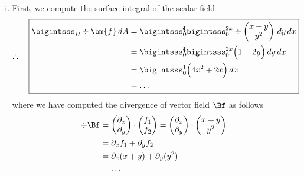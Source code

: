 \documentclass[12pt]{article}
\begin{document}
\begin{enumerate}[(i)]
	\item First, we compute the surface integral of the scalar field
	      \begin{align}
		      \therefore\quad
		      \boxed{
			      \begin{aligned}
				      \bigintsss_B \div \bm{f} \, dA
				       & =\bigintsss_0^1 \!\!\! \bigintsss_0^{2x}
				      \div
				      \begin{pmatrix} x+y\\y^2 \end{pmatrix} \, dy \, dx                     \\
				       & =\bigintsss_0^1 \!\!\! \bigintsss_0^{2x} \Big(1+2y\Big) \, dy \, dx \\
				       & =\bigintsss_0^1 \Big( 4x^2 + 2x \Big) \, dx                         \\
				       & = \dots
			      \end{aligned}
		      }
	      \end{align}
	      where we have computed the divergence of vector field $\Bf$ as follows
	      \begin{align}
		      \div \Bf 
		       & = 	
		      \begin{pmatrix} \partial_x \\ \partial_y \end{pmatrix}
		      \cdot 
		      \begin{pmatrix} f_1 \\ f_2 \end{pmatrix}
		      =
		      \begin{pmatrix} \partial_x \\ \partial_y \end{pmatrix}
		      \cdot 
		      \begin{pmatrix} x+y \\ y^2 \end{pmatrix} \\
		       & 
		      = \partial_x f_1 + \partial_yf_2         \\
		       & 
		      = \partial_x (x+y) + \partial_y(y^2)     \\
		       & 
		      = \dots
	      \end{align}
	      

\end{enumerate}
\end{document}
